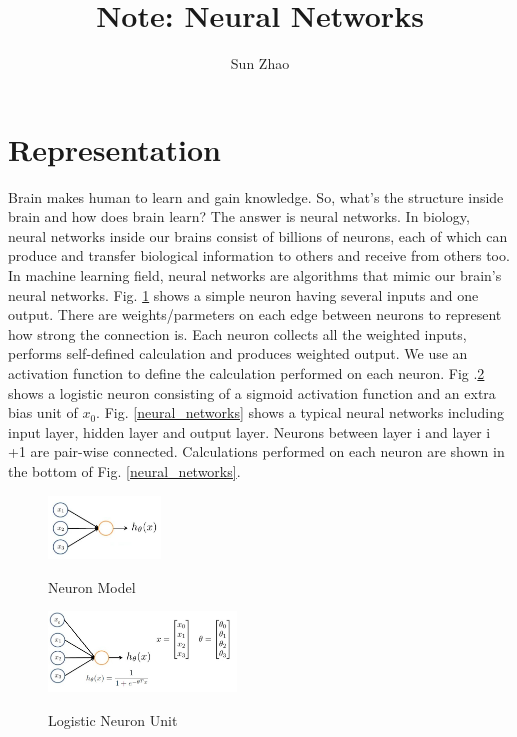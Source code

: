 \documentclass{article}
\title{Note: Neural Networks}
\author{Sun Zhao}
\begin{document}
\maketitle
\newpage

\section{Representation}
Brain makes human to learn and gain knowledge. So, what's the structure inside brain and how does brain learn? The answer is neural networks. In biology, neural networks inside our brains consist of billions of neurons, each of which can produce and transfer biological information to others and receive from others too. In machine learning field, neural networks are algorithms that mimic our brain's neural networks. Fig. \ref{neuron_model} shows a simple neuron having several inputs and one output. There are weights/parmeters on each edge between neurons to represent how strong the connection is. Each neuron collects all the weighted inputs, performs self-defined calculation and produces weighted output. We use an activation function to define the calculation performed on each neuron. Fig .\ref{logistic_neuron_unit} shows a logistic neuron consisting of a sigmoid activation function and an extra bias unit of $x_{0}$. Fig. \ref{neural_networks} shows a typical neural networks including input layer, hidden layer and output layer. Neurons between layer i and layer i +1 are pair-wise connected. Calculations performed on each neuron are shown in the bottom of Fig. \ref{neural_networks}.
\begin{figure}[ht]
  \centering
  \includegraphics[width=3cm]{Figure1.jpg}\\
  \caption{Neuron Model}\label{neuron_model}
\end{figure}
\begin{figure}[ht]
  \centering
  \includegraphics[width=5cm]{Figure2.jpg}\\
  \caption{Logistic Neuron Unit}\label{logistic_neuron_unit}
\end{figure}
\end{document}
